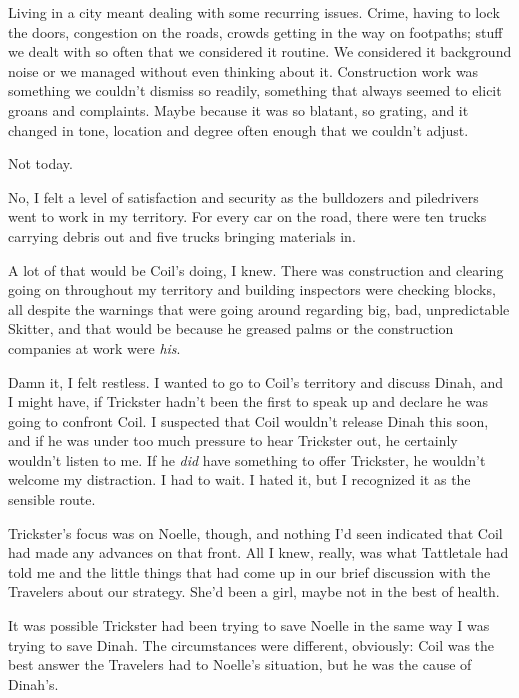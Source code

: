 





Living in a city meant dealing with some recurring issues.  Crime, having to lock the doors, congestion on the roads, crowds getting in the way on footpaths; stuff we dealt with so often that we considered it routine.  We considered it background noise or we managed without even thinking about it.  Construction work was something we couldn't dismiss so readily, something that always seemed to elicit groans and complaints.  Maybe because it was so blatant, so grating, and it changed in tone, location and degree often enough that we couldn't adjust.



Not today.



No, I felt a level of satisfaction and security as the bulldozers and piledrivers went to work in my territory.  For every car on the road, there were ten trucks carrying debris out and five trucks bringing materials in.



A lot of that would be Coil's doing, I knew.  There was construction and clearing going on throughout my territory and building inspectors were checking blocks, all despite the warnings that were going around regarding big, bad, unpredictable Skitter, and that would be because he greased palms or the construction companies at work were \emph{his}.



Damn it, I felt restless.  I wanted to go to Coil's territory and discuss Dinah, and I might have, if Trickster hadn't been the first to speak up and declare he was going to confront Coil.  I suspected that Coil wouldn't release Dinah this soon, and if he was under too much pressure to hear Trickster out, he certainly wouldn't listen to me.  If he \emph{did} have something to offer Trickster, he wouldn't welcome my distraction.  I had to wait.  I hated it, but I recognized it as the sensible route.



Trickster's focus was on Noelle, though, and nothing I'd seen indicated that Coil had made any advances on that front.  All I knew, really, was what Tattletale had told me and the little things that had come up in our brief discussion with the Travelers about our strategy.  She'd been a girl, maybe not in the best of health.



It was possible Trickster had been trying to save Noelle in the same way I was trying to save Dinah.  The circumstances were different, obviously: Coil was the best answer the Travelers had to Noelle's situation, but he was the cause of Dinah's.



